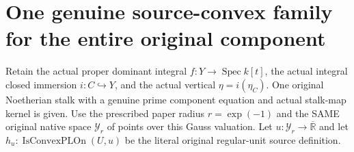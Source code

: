 \section{One genuine source-convex family for the entire original component}

Retain the actual proper dominant integral $f:Y\to\operatorname{Spec}k[t]$,
the actual integral closed immersion $i:C\hookrightarrow Y$, and the
actual vertical $\eta=i(\eta_C)$. One original Noetherian stalk with a
genuine prime component equation and actual stalk-map kernel is given.
Use the prescribed paper radius $r=\exp(-1)$ and the SAME original native
space $\mathcal Y_r$ of points over this Gauss valuation.
Let $u:\mathcal Y_r\to\overline{\mathbb R}$ and let
\(h_u:\operatorname{IsConvexPLOn}(U,u)\) be the literal original
regular-unit source definition.

